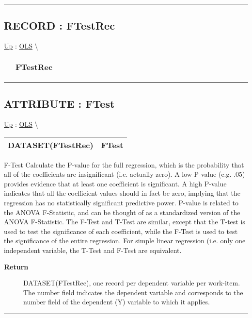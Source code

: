 \rule{\linewidth}{0.5pt}
\subsection*{RECORD : FTestRec}
\hypertarget{ecldoc:linearregression.ols.ftestrec}{}
\hyperlink{ecldoc:linearregression.ols}{Up} :
\hspace{0pt} \hyperlink{ecldoc:linearregression.ols}{OLS} \textbackslash 

{\renewcommand{\arraystretch}{1.5}
\begin{tabularx}{\textwidth}{|>{\raggedright\arraybackslash}l|X|}
\hline
\hspace{0pt} & FTestRec \\
\hline
\end{tabularx}
}

\par


\rule{\linewidth}{0.5pt}
\subsection*{ATTRIBUTE : FTest}
\hypertarget{ecldoc:linearregression.ols.ftest}{}
\hyperlink{ecldoc:linearregression.ols}{Up} :
\hspace{0pt} \hyperlink{ecldoc:linearregression.ols}{OLS} \textbackslash 

{\renewcommand{\arraystretch}{1.5}
\begin{tabularx}{\textwidth}{|>{\raggedright\arraybackslash}l|X|}
\hline
\hspace{0pt}DATASET(FTestRec) & FTest \\
\hline
\end{tabularx}
}

\par
F-Test Calculate the P-value for the full regression, which is the probability that all of the coefficients are insignificant (i.e. actually zero). A low P-value (e.g. .05) provides evidence that at least one coefficient is significant. A high P-value indicates that all the coefficient values should in fact be zero, implying that the regression has no statistically significant predictive power. P-value is related to the ANOVA F-Statistic, and can be thought of as a standardized version of the ANOVA F-Statistic. The F-Test and T-Test are similar, except that the T-test is used to test the significance of each coefficient, while the F-Test is used to test the significance of the entire regression. For simple linear regression (i.e. only one independent variable, the T-Test and F-Test are equivalent.

\par
\begin{description}
\item [\textbf{Return}] DATASET(FTestRec), one record per dependent variable per work-item. The number field indicates the dependent variable and corresponds to the number field of the dependent (Y) variable to which it applies.
\end{description}

\rule{\linewidth}{0.5pt}


